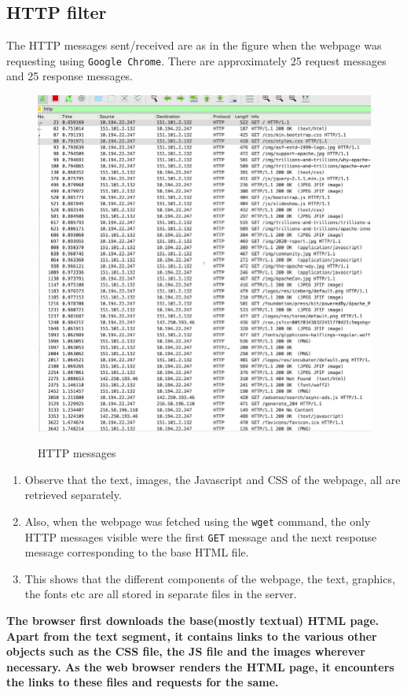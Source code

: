 \documentclass[a4paper]{article}
\begin{document}
\subsection{HTTP filter}
The HTTP messages sent/received are as in the figure when the webpage was requesting using \texttt{Google Chrome}. There are approximately 25  request  messages and 25 response messages.
\begin{figure}[h]
\centering
\caption{HTTP messages}
\includegraphics{http.png}
\\
\end{figure}
\begin{enumerate}
    \item Observe that the text, images, the Javascript and CSS of the webpage, all are retrieved separately. 
    \item Also, when the webpage was fetched using the \texttt{wget} command, the only HTTP messages visible were the first \texttt{GET} message and the next response message corresponding to the base HTML file.
    \item This shows that the different components of the webpage, the text, graphics, the fonts etc are all stored in separate files in the server. 
\end{enumerate}
\textbf{The browser first downloads the base(mostly textual) HTML page. Apart from the text segment, it contains links to the various other objects such as the CSS file, the JS file and the images wherever necessary. As the web browser renders the HTML page, it encounters the links to these files and requests for the same.}
\end{document}
